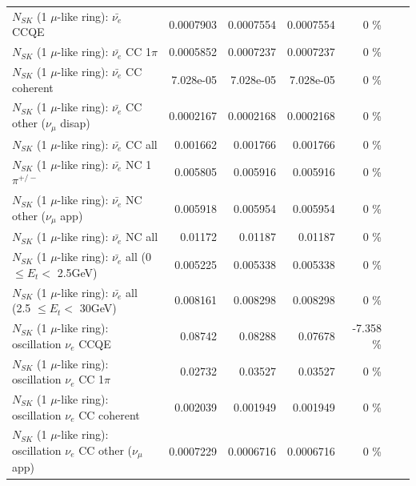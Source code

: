 \begin{table}
\begin{tabular}{| l | r | r | r  r | r  r |}
\hline
\hline
\hline
                                $N_{SK}$ (1 $\mu$-like ring): $\bar{\nu_e}$ CCQE &       0.0007903 &      0.0007554 &      0.0007554 &       0 \%  & & \\
                           $N_{SK}$ (1 $\mu$-like ring): $\bar{\nu_e}$ CC 1$\pi$ &       0.0005852 &      0.0007237 &      0.0007237 &       0 \%  & & \\
                         $N_{SK}$ (1 $\mu$-like ring): $\bar{\nu_e}$ CC coherent &       7.028e-05 &      7.028e-05 &      7.028e-05 &       0 \%  & & \\
          $N_{SK}$ (1 $\mu$-like ring): $\bar{\nu_e}$ CC other ($\nu_\mu$ disap) &       0.0002167 &      0.0002168 &      0.0002168 &       0 \%  & & \\
                            $N_{SK}$ (1 $\mu$-like ring): $\bar{\nu_{e}}$ CC all &        0.001662 &       0.001766 &       0.001766 &       0 \%  & & \\
\hline
                     $N_{SK}$ (1 $\mu$-like ring): $\bar{\nu_e}$ NC 1$\pi^{+/-}$ &        0.005805 &       0.005916 &       0.005916 &       0 \%  & & \\
            $N_{SK}$ (1 $\mu$-like ring): $\bar{\nu_e}$ NC other ($\nu_\mu$ app) &        0.005918 &       0.005954 &       0.005954 &       0 \%  & & \\
                            $N_{SK}$ (1 $\mu$-like ring): $\bar{\nu_{e}}$ NC all &         0.01172 &        0.01187 &        0.01187 &       0 \%  & & \\
\hline
     $N_{SK}$ (1 $\mu$-like ring): $\bar{\nu_{e}}$ all (0 $\leq E_{t} <$ 2.5GeV) &        0.005225 &       0.005338 &       0.005338 &       0 \%  & & \\
    $N_{SK}$ (1 $\mu$-like ring): $\bar{\nu_{e}}$ all (2.5 $\leq E_{t} <$ 30GeV) &        0.008161 &       0.008298 &       0.008298 &       0 \%  & & \\
\hline
\hline
\hline
                          $N_{SK}$ (1 $\mu$-like ring): oscillation $\nu_e$ CCQE &         0.08742 &        0.08288 &        0.07678 &  -7.358 \%  & & \\
                     $N_{SK}$ (1 $\mu$-like ring): oscillation $\nu_e$ CC 1$\pi$ &         0.02732 &        0.03527 &        0.03527 &       0 \%  & & \\
                   $N_{SK}$ (1 $\mu$-like ring): oscillation $\nu_e$ CC coherent &        0.002039 &       0.001949 &       0.001949 &       0 \%  & & \\
      $N_{SK}$ (1 $\mu$-like ring): oscillation $\nu_e$ CC other ($\nu_\mu$ app) &       0.0007229 &      0.0006716 &      0.0006716 &       0 \%  & & \\

\end{tabular}
\end{table}
